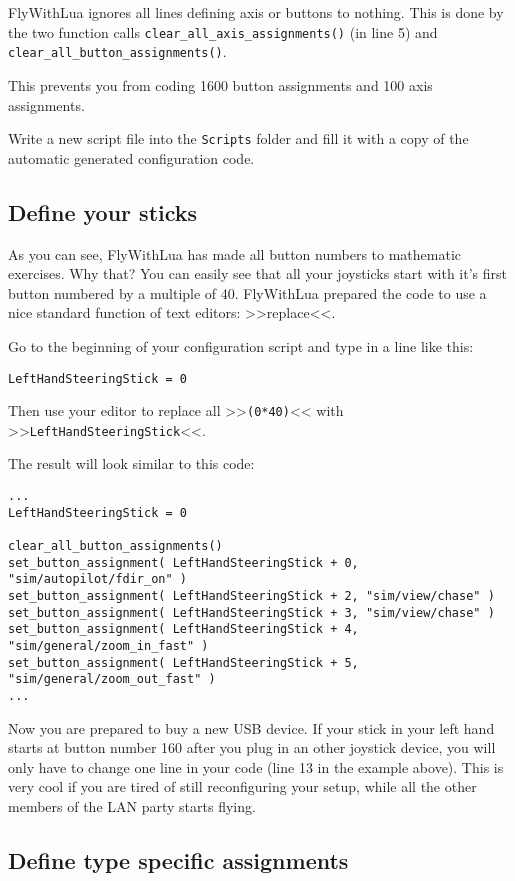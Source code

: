 \documentclass[11pt,parskip=half,a4paper]{scrartcl}
\begin{document}
FlyWithLua ignores all lines defining axis or buttons to nothing. This is done by the two function calls \verb|clear_all_axis_assignments()| (in line 5) and \verb|clear_all_button_assignments()|.

This prevents you from coding 1600 button assignments and 100 axis assignments.

Write a new script file into the \verb|Scripts| folder and fill it with a copy of the automatic generated configuration code.

\subsection{Define your sticks}

As you can see, FlyWithLua has made all button numbers to mathematic exercises. Why that? You can easily see that all your joysticks start with it's first button numbered by a multiple of 40. FlyWithLua prepared the code to use a nice standard function of text editors: >>replace<<.

Go to the beginning of your configuration script and type in a line like this:

\verb|LeftHandSteeringStick = 0|

Then use your editor to replace all >>\verb|(0*40)|<< with >>\verb|LeftHandSteeringStick|<<.

The result will look similar to this code:

\begin{lstlisting}[firstnumber=12]
...
LeftHandSteeringStick = 0

clear_all_button_assignments()
set_button_assignment( LeftHandSteeringStick + 0, "sim/autopilot/fdir_on" )
set_button_assignment( LeftHandSteeringStick + 2, "sim/view/chase" )
set_button_assignment( LeftHandSteeringStick + 3, "sim/view/chase" )
set_button_assignment( LeftHandSteeringStick + 4, "sim/general/zoom_in_fast" )
set_button_assignment( LeftHandSteeringStick + 5, "sim/general/zoom_out_fast" )
...
\end{lstlisting}

Now you are prepared to buy a new USB device. If your stick in your left hand starts at button number 160 after you plug in an other joystick device, you will only have to change one line in your code (line 13 in the example above). This is very cool if you are tired of still reconfiguring your setup, while all the other members of the LAN party starts flying.

\subsection{Define type specific assignments}
\end{document}
